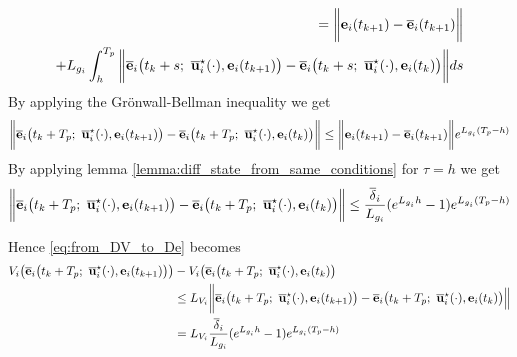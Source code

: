 \begin{gg_box}
\begin{alignat}{2}
  = \bigg \| \vect{e}_i(t_{k+1}) - \overline{\vect{e}}_i(t_{k+1}) \bigg\| \\
  +  L_{g_i} \int_{h}^{T_p} \bigg\| \overline{\vect{e}}_i\big(t_k + s;\ \overline{\vect{u}}_i^{\star}(\cdot), \vect{e}_i(t_{k+1})\big)
  - \overline{\vect{e}}_i\big(t_k + s;\ \overline{\vect{u}}_i^{\star}(\cdot), \vect{e}_i(t_k)\big) \bigg\| ds
\end{alignat}
By applying the  Gr\"{o}nwall-Bellman inequality we get
\begin{alignat}{2}
  \bigg \|\overline{\vect{e}}_i\big(t_k + T_p;\ \overline{\vect{u}}_i^{\star}(\cdot), \vect{e}_i(t_{k+1})\big)
    - \overline{\vect{e}}_i\big(t_k + T_p;\ \overline{\vect{u}}_i^{\star}(\cdot), \vect{e}_i(t_k)\big) \bigg\|
    \leq \bigg \| \vect{e}_i(t_{k+1}) - \overline{\vect{e}}_i(t_{k+1}) \bigg\| e^{L_{g_i} (T_p - h)}
\end{alignat}
By applying lemma \eqref{lemma:diff_state_from_same_conditions} for $\tau = h$
we get
\begin{alignat}{2}
  \bigg \|\overline{\vect{e}}_i\big(t_k + T_p;\ \overline{\vect{u}}_i^{\star}(\cdot), \vect{e}_i(t_{k+1})\big)
    - \overline{\vect{e}}_i\big(t_k + T_p;\ \overline{\vect{u}}_i^{\star}(\cdot), \vect{e}_i(t_k)\big) \bigg\|
    \leq \dfrac{\overline{\delta}_i}{L_{g_i}} (e^{L_{g_i}h} - 1) e^{L_{g_i} (T_p - h)}
\end{alignat}

Hence \eqref{eq:from_DV_to_De} becomes
\begin{align}
  V_i\big(\overline{\vect{e}}_i\big(t_k + T_p;\ \overline{\vect{u}}_i^{\star}(\cdot), \vect{e}_i(t_{k+1})\big)\big)
    &- V_i\big(\overline{\vect{e}}_i\big(t_k + T_p;\ \overline{\vect{u}}_i^{\star}(\cdot), \vect{e}_i(t_k)\big) \\
  &\leq L_{V_i}\bigg \| \overline{\vect{e}}_i\big(t_k + T_p;\ \overline{\vect{u}}_i^{\star}(\cdot), \vect{e}_i(t_{k+1})\big)
    - \overline{\vect{e}}_i\big(t_k + T_p;\ \overline{\vect{u}}_i^{\star}(\cdot), \vect{e}_i(t_k) \big)\Big\| \\
  &= L_{V_i} \dfrac{\overline{\delta}_i}{L_{g_i}} (e^{L_{g_i}h} - 1) e^{L_{g_i} (T_p - h)}
\label{eq:from_DV_to_eq}
\end{align}

\end{gg_box}














